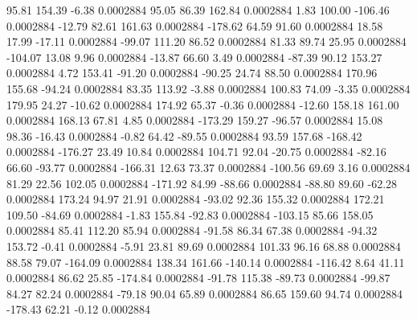        95.81      154.39       -6.38     0.0002884
       95.05       86.39      162.84     0.0002884
        1.83      100.00     -106.46     0.0002884
      -12.79       82.61      161.63     0.0002884
     -178.62       64.59       91.60     0.0002884
       18.58       17.99      -17.11     0.0002884
      -99.07      111.20       86.52     0.0002884
       81.33       89.74       25.95     0.0002884
     -104.07       13.08        9.96     0.0002884
      -13.87       66.60        3.49     0.0002884
      -87.39       90.12      153.27     0.0002884
        4.72      153.41      -91.20     0.0002884
      -90.25       24.74       88.50     0.0002884
      170.96      155.68      -94.24     0.0002884
       83.35      113.92       -3.88     0.0002884
      100.83       74.09       -3.35     0.0002884
      179.95       24.27      -10.62     0.0002884
      174.92       65.37       -0.36     0.0002884
      -12.60      158.18      161.00     0.0002884
      168.13       67.81        4.85     0.0002884
     -173.29      159.27      -96.57     0.0002884
       15.08       98.36      -16.43     0.0002884
       -0.82       64.42      -89.55     0.0002884
       93.59      157.68     -168.42     0.0002884
     -176.27       23.49       10.84     0.0002884
      104.71       92.04      -20.75     0.0002884
      -82.16       66.60      -93.77     0.0002884
     -166.31       12.63       73.37     0.0002884
     -100.56       69.69        3.16     0.0002884
       81.29       22.56      102.05     0.0002884
     -171.92       84.99      -88.66     0.0002884
      -88.80       89.60      -62.28     0.0002884
      173.24       94.97       21.91     0.0002884
      -93.02       92.36      155.32     0.0002884
      172.21      109.50      -84.69     0.0002884
       -1.83      155.84      -92.83     0.0002884
     -103.15       85.66      158.05     0.0002884
       85.41      112.20       85.94     0.0002884
      -91.58       86.34       67.38     0.0002884
      -94.32      153.72       -0.41     0.0002884
       -5.91       23.81       89.69     0.0002884
      101.33       96.16       68.88     0.0002884
       88.58       79.07     -164.09     0.0002884
      138.34      161.66     -140.14     0.0002884
     -116.42        8.64       41.11     0.0002884
       86.62       25.85     -174.84     0.0002884
      -91.78      115.38      -89.73     0.0002884
      -99.87       84.27       82.24     0.0002884
      -79.18       90.04       65.89     0.0002884
       86.65      159.60       94.74     0.0002884
     -178.43       62.21       -0.12     0.0002884
